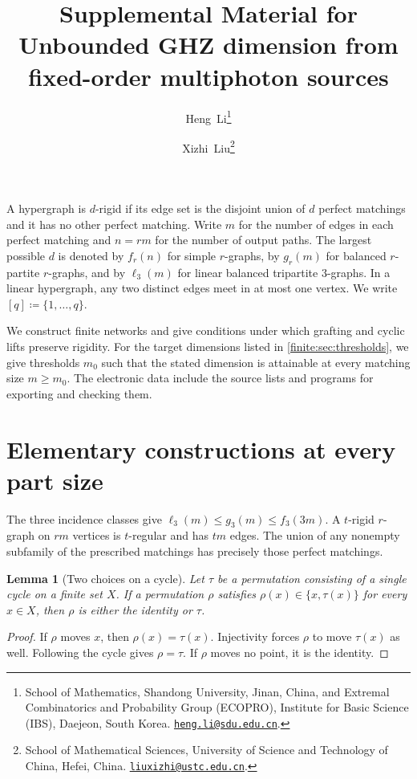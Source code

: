 \documentclass[10pt]{article}
\title{\large Supplemental Material for\\[2pt]\Large\bfseries Unbounded GHZ dimension from fixed-order multiphoton sources}
\author{
Heng~Li\thanks{School of Mathematics, Shandong University, Jinan, China, and Extremal Combinatorics and Probability Group (ECOPRO), Institute for Basic Science (IBS), Daejeon, South Korea. \href{mailto:heng.li@sdu.edu.cn}{\nolinkurl{heng.li@sdu.edu.cn}}.}
\and
Xizhi~Liu\thanks{School of Mathematical Sciences, University of Science and Technology of China, Hefei, China. \href{mailto:liuxizhi@ustc.edu.cn}{\nolinkurl{liuxizhi@ustc.edu.cn}}.}
}
\date{}
\numberwithin{equation}{section}
\newtheorem{lemma}[lemma]{Lemma}\aliascntresetthe{lemma}
\begin{document}
\maketitle

A hypergraph is $d$-rigid if its edge set is the disjoint union of $d$ perfect matchings and it has no other perfect matching. Write $m$ for the number of edges in each perfect matching and $n=rm$ for the number of output paths. The largest possible $d$ is denoted by $f_r(n)$ for simple $r$-graphs, by $g_r(m)$ for balanced $r$-partite $r$-graphs, and by $\ell_3(m)$ for linear balanced tripartite $3$-graphs. In a linear hypergraph, any two distinct edges meet in at most one vertex. We write $[q]\coloneqq\{1,\ldots,q\}$.

We construct finite networks and give conditions under which grafting and cyclic lifts preserve rigidity. For the target dimensions listed in \cref{finite:sec:thresholds}, we give thresholds $m_0$ such that the stated dimension is attainable at every matching size $m\ge m_0$. The electronic data include the source lists and programs for exporting and checking them.

\tableofcontents

\section{Elementary constructions at every part size}\label{finite:sec:elementary}
The three incidence classes give $\ell_3(m)\le g_3(m)\le f_3(3m)$. A $t$-rigid $r$-graph on $rm$ vertices is $t$-regular and has $tm$ edges.
The union of any nonempty subfamily of the prescribed matchings has precisely those perfect matchings.

\begin{lemma}[Two choices on a cycle]\label{finite:lem:two-choice}
Let $\tau$ be a permutation consisting of a single cycle on a finite set $X$. If a permutation
$\rho$ satisfies $\rho(x)\in\{x,\tau(x)\}$ for every $x\in X$, then
$\rho$ is either the identity or $\tau$.
\end{lemma}
\begin{proof}
If $\rho$ moves $x$, then $\rho(x)=\tau(x)$. Injectivity forces $\rho$
to move $\tau(x)$ as well. Following the cycle gives $\rho=\tau$.
If $\rho$ moves no point, it is the identity.
\end{proof}
\end{document}
